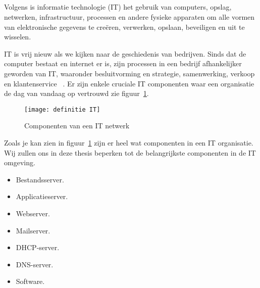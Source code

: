 \subsection{}
\label{subsec:Definitie Informatie technologie}
Volgens \textcite{Castagna2021} is informatie technologie (IT) het gebruik van computers, opslag, netwerken, infrastructuur, processen en andere fysieke apparaten om alle vormen van elektronische gegevens te creëren, verwerken, opslaan, beveiligen en uit te wisselen. 

IT is vrij nieuw als we kijken naar de geschiedenis van bedrijven. Sinds dat de computer bestaat en internet er is, zijn processen in een bedrijf afhankelijker geworden van IT, waaronder besluitvorming en strategie, samenwerking, verkoop en klantenservice ~\autocite{SecureiconTeam2019}. Er zijn enkele cruciale IT componenten waar een organisatie de dag van vandaag op vertrouwd zie figuur~\ref{fig:2.1}.


\begin{figure}
    \texttt{[image: definitie IT]}
    \caption{Componenten van een IT netwerk\autocite{Castagna2021} \label{fig:2.1}} 
\end{figure}

Zoals je kan zien in figuur~\ref{fig:2.1} zijn er heel wat componenten in een IT organisatie. Wij zullen ons in deze thesis beperken tot de belangrijkste componenten in de IT omgeving. 
\begin{itemize}
    \item Bestandsserver.
    \item Applicatieserver.
    \item Webserver.
    \item Mailserver.
    \item DHCP-server.
    \item DNS-server.
    \item Software.
\end{itemize}
\subsection{}
\label{subsec:ITcomponenten}
